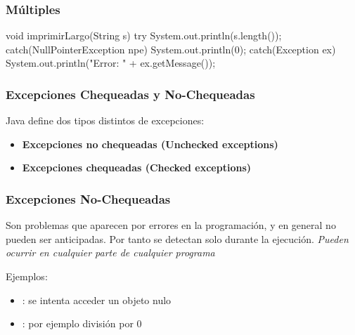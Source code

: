 \documentclass{beamer}
\begin{document}
\begin{frame}[fragile]
  \frametitle{Múltiples }

\begin{jsmall}
void imprimirLargo(String s) {
    try {      
      System.out.println(s.length());
    } catch(NullPointerException npe) {
      System.out.println(0);
    } catch(Exception ex) {
      System.out.println("Error: " + ex.getMessage());
    }
}
\end{jsmall}

  
\end{frame}

\begin{frame}
  \frametitle{Excepciones Chequeadas y No-Chequeadas}
  Java define dos tipos distintos de excepciones:

  \begin{itemize}
    
  \item \textbf{Excepciones no chequeadas (Unchecked exceptions)}

  \item \textbf{Excepciones chequeadas (Checked exceptions)}
  \end{itemize}
\end{frame}

\begin{frame}
  \frametitle{Excepciones No-Chequeadas}
    
  \begin{block}{}
    Son problemas que aparecen por errores en la programación, y en
    general no pueden ser anticipadas. Por tanto se detectan solo
    durante la ejecución. \emph{Pueden ocurrir en cualquier parte de
      cualquier programa}
  \end{block}

  \begin{block}{}
    Ejemplos:

    \begin{itemize}
    \item {}: se intenta acceder
      un objeto nulo
    \item {}: por ejemplo división
      por 0
    \end{itemize}
  \end{block}

\end{frame}
\end{document}
